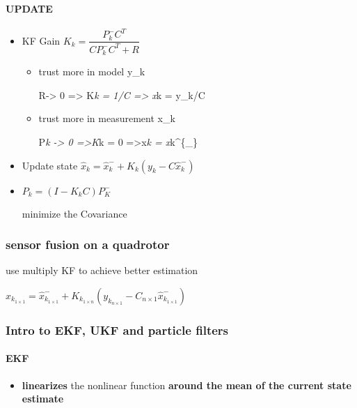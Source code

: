 \documentclass[]{article}
\let\oldparagraph\paragraph
\renewcommand{\paragraph}[1]{\oldparagraph{#1}\mbox{}}
\begin{document}
\paragraph{UPDATE}\label{header-n950}

\begin{itemize}
\item
  KF Gain \(K_{k}=\dfrac{P_{k}^{-} C^{T}}{C P_{k}^{-} C^{T}+R}\)

  \begin{itemize}
  \item
    trust more in model y\_k

    R-\textgreater{} 0 =\textgreater{} K\emph{k = 1/C =\textgreater{}
    x}k = y\_k/C
  \item
    trust more in measurement x\_k

    P\emph{k -\textgreater{} 0 =\textgreater{}K}k = 0
    =\textgreater{}x\emph{k = x}k\^{}\{\_\}
  \end{itemize}
\item
  Update state
  \(\hat{x}_{k}=\hat{x}_{k}^{-}+K_{k}\left(y_{k}-C \hat{x}_{k}^{-}\right)\)
\item
  \(P_{k}=\left(I-K_{k} C\right) P_{K}^{-}\)

  minimize the Covariance
\end{itemize}

\subsubsection{sensor fusion on a quadrotor}\label{header-n966}

use multiply KF to achieve better estimation

\(\hat{x}_{k_{1 \times 1}}=\hat{x}_{k_{1 \times 1}}^{-}+K_{k_{1 \times n}}\left(y_{k_{n \times 1}}-C_{n \times 1} \hat{x}_{k_{1 \times 1}}^{-}\right)\)

\subsubsection{Intro to EKF, UKF and particle
filters}\label{header-n969}

\paragraph{EKF}\label{header-n970}

\begin{itemize}
\item
  \textbf{linearizes} the nonlinear function \textbf{around the mean of
  the current state estimate}
\end{itemize}
\end{document}
